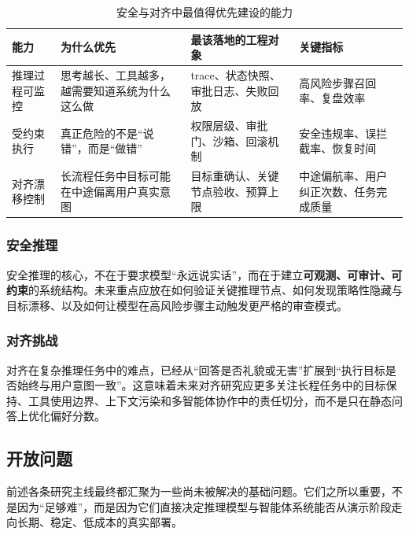 \documentclass[12pt,a4paper]{article}
\begin{document}
\begin{table}[H]
\centering
\small
\caption{安全与对齐中最值得优先建设的能力}
\begin{tabular}{p{3.0cm}p{4.0cm}p{3.8cm}p{3.0cm}}
\toprule
\textbf{能力} & \textbf{为什么优先} & \textbf{最该落地的工程对象} & \textbf{关键指标} \\
\midrule
推理过程可监控 & 思考越长、工具越多，越需要知道系统为什么这么做 & trace、状态快照、审批日志、失败回放 & 高风险步骤召回率、复盘效率 \\
受约束执行 & 真正危险的不是“说错”，而是“做错” & 权限层级、审批门、沙箱、回滚机制 & 安全违规率、误拦截率、恢复时间 \\
对齐漂移控制 & 长流程任务中目标可能在中途偏离用户真实意图 & 目标重确认、关键节点验收、预算上限 & 中途偏航率、用户纠正次数、任务完成质量 \\
\bottomrule
\end{tabular}
\end{table}

\subsubsection{安全推理}

安全推理的核心，不在于要求模型“永远说实话”，而在于建立\textbf{可观测、可审计、可约束}的系统结构。未来重点应放在如何验证关键推理节点、如何发现策略性隐藏与目标漂移、以及如何让模型在高风险步骤主动触发更严格的审查模式。

\subsubsection{对齐挑战}

对齐在复杂推理任务中的难点，已经从“回答是否礼貌或无害”扩展到“执行目标是否始终与用户意图一致”。这意味着未来对齐研究应更多关注长程任务中的目标保持、工具使用边界、上下文污染和多智能体协作中的责任切分，而不是只在静态问答上优化偏好分数。

\subsection{开放问题}

前述各条研究主线最终都汇聚为一些尚未被解决的基础问题。它们之所以重要，不是因为“足够难”，而是因为它们直接决定推理模型与智能体系统能否从演示阶段走向长期、稳定、低成本的真实部署。
\end{document}

